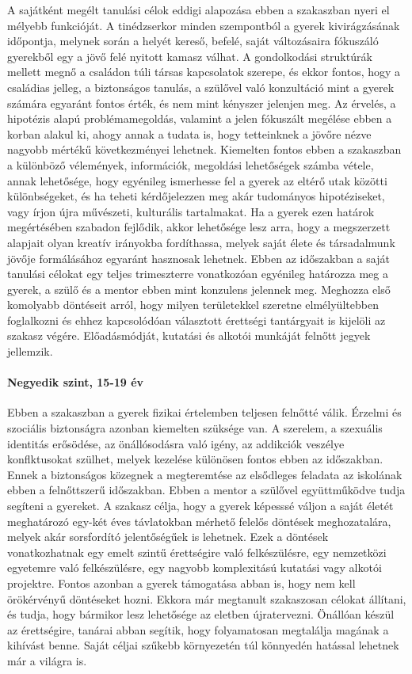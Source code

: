   
A sajátként megélt tanulási célok eddigi alapozása ebben a szakaszban nyeri el mélyebb funkcióját. A tinédzserkor minden szempontból a gyerek kivirágzásának időpontja, melynek során a helyét kereső, befelé, saját változásaira fókuszáló gyerekből egy a jövő felé nyitott kamasz válhat. A gondolkodási struktúrák mellett megnő a családon túli társas kapcsolatok szerepe, és ekkor fontos, hogy a családias jelleg, a biztonságos tanulás, a szülővel való konzultáció mint a gyerek számára egyaránt fontos érték, és nem mint kényszer jelenjen meg. 
Az érvelés, a hipotézis alapú problémamegoldás, valamint a jelen fókuszált megélése ebben a korban alakul ki, ahogy annak a tudata is, hogy tetteinknek a jövőre nézve nagyobb mértékű következményei lehetnek. Kiemelten fontos ebben a szakaszban a különböző vélemények, információk, megoldási lehetőségek számba vétele, annak lehetősége, hogy egyénileg ismerhesse fel a gyerek az eltérő utak közötti különbségeket, és ha teheti kérdőjelezzen meg akár tudományos hipotéziseket, vagy írjon újra művészeti, kulturális tartalmakat.
Ha a gyerek ezen határok megértésében szabadon fejlődik, akkor lehetősége lesz arra, hogy a megszerzett alapjait olyan kreatív irányokba fordíthassa, melyek saját élete és társadalmunk jövője formálásához egyaránt hasznosak lehetnek.
Ebben az időszakban a saját tanulási célokat egy teljes trimeszterre vonatkozóan egyénileg határozza meg a gyerek, a szülő és a mentor ebben mint konzulens jelennek meg. Meghozza első komolyabb döntéseit arról, hogy milyen területekkel szeretne elmélyültebben foglalkozni és ehhez kapcsolódóan választott érettségi tantárgyait is kijelöli az szakasz végére. 
Előadásmódját, kutatási és alkotói munkáját felnőtt jegyek jellemzik. 
      
      \paragraph{Negyedik szint, 15-19 év} Ebben a szakaszban a gyerek fizikai értelemben teljesen felnőtté válik. Érzelmi és szociális biztonságra azonban kiemelten szüksége van. A szerelem, a szexuális identitás erősödése, az önállósodásra való igény, az addikciók veszélye konflktusokat szülhet, melyek kezelése különösen fontos ebben az időszakban.
Ennek a biztonságos közegnek a megteremtése az elsődleges feladata az iskolának ebben a felnőttszerű időszakban. Ebben a mentor a szülővel együttműködve tudja segíteni a gyereket. A szakasz célja, hogy a gyerek képesssé váljon a saját életét  meghatározó egy-két éves távlatokban mérhető felelős döntések meghozatalára, melyek akár sorsfordító jelentőségűek is lehetnek. Ezek a döntések  vonatkozhatnak egy emelt szintű érettségire való felkészülésre, egy nemzetközi egyetemre való felkészülésre, egy nagyobb komplexitású kutatási vagy alkotói projektre. Fontos azonban a gyerek támogatása abban is, hogy nem kell örökérvényű döntéseket hozni. Ekkora már megtanult szakaszosan célokat állítani, és tudja, hogy bármikor lesz lehetősége az eletben újratervezni. Önállóan készül az érettségire, tanárai abban segítik, hogy folyamatosan megtalálja magának a kihívást benne. Saját céljai szűkebb környezetén túl könnyedén hatással lehetnek már a világra is.  

